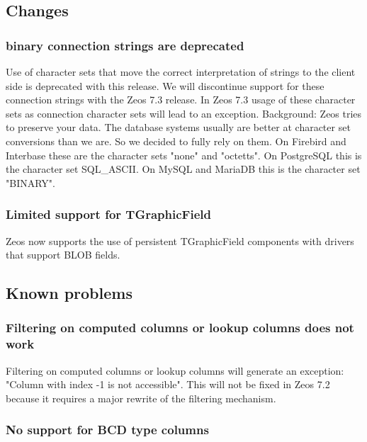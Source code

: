 \documentclass[a4paper,12pt,oneside]{book}
\begin{document}
\subsection{Changes}
\label{sec:Rev6_General_Changes}

\subsubsection{binary connection strings are deprecated}
\label{sec:Rev6_General_Changes_BinaryConnectonStringsDeprecated}

Use of character sets that move the correct interpretation of strings to the client side is deprecated with this release.
We will discontinue support for these connection strings with the Zeos 7.3 release.
In Zeos 7.3 usage of these character sets as connection character sets will lead to an exception.
Background:
Zeos tries to preserve your data.
The database systems usually are better at character set conversions than we are.
So we decided to fully rely on them.
On Firebird and Interbase these are the character sets "none" and "octetts".
On PostgreSQL this is the character set SQL\_ASCII.
On MySQL and MariaDB this is the character set "BINARY".

\subsubsection{Limited support for TGraphicField}
\label{sec:Rev6_General_Changes_TGrapgicField}

Zeos now supports the use of persistent TGraphicField components with drivers that support BLOB fields.

\subsection{Known problems}
\label{sec:Rev6_General_KnownProblems}

\subsubsection{Filtering on computed columns or lookup columns does not work}
\label{sec:Rev6_General_KnownProblems_FilteringComputeColumnsLookupColumns}

Filtering on computed columns or lookup columns will generate an exception: "Column with index -1 is not accessible".
This will not be fixed in Zeos 7.2 because it requires a major rewrite of the filtering mechanism.

\subsubsection{No support for BCD type columns}
\label{sec:Rev6_General_KnownProblems_BCD}
\end{document}
